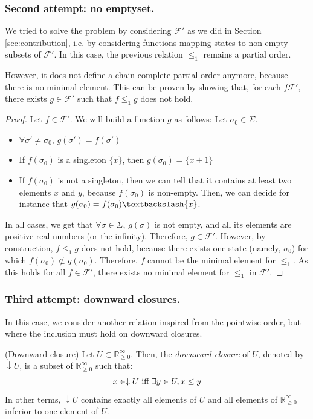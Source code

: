\documentclass[a4paper,10pt]{llncs}
\def\RRposi {{\mathbb R_{\geq 0}^{\infty}}}
\begin{document}
\subsubsection{Second attempt: no emptyset.}
We tried to solve the problem by considering $\mathcal{F}'$ as we did in Section \ref{sec:contribution}, i.e. by considering functions mapping states to \underline{non-empty} subsets of $\mathcal{F}'$. In this case, the previous relation $\leq_1$ remains a partial order. \bigskip

However, it does not define a chain-complete partial order anymore, because there is no minimal element. This can be proven by showing that, for each $f \mathcal{F}'$, there exists $g \in \mathcal{F}'$ such that $f \leq_1 g$ does not hold.\bigskip

\begin{proof}
Let $f \in \mathcal{F}'$. We will build a function $g$ as follows:
Let $\sigma_0 \in \Sigma$.
\begin{itemize}
\item $\forall \sigma' \neq \sigma_0$, $g(\sigma') = f(\sigma')$
\item If $f(\sigma_0)$ is a singleton $\{x\}$, then $g(\sigma_0) = \{x + 1\}$
\item If $f(\sigma_0)$ is not a singleton, then we can tell that it contains at least two elements $x$ and $y$, because $f(\sigma_0)$ is non-empty. Then, we can decide for instance that $g(\sigma_0) = f(\sigma_0)\textbackslash\{x\}$.
\end{itemize}
In all cases, we get that $\forall \sigma \in \Sigma$, $g(\sigma)$ is not empty, and all its elements are positive real numbers (or the infinity). Therefore, $g \in \mathcal{F}'$. However, by construction, $f \leq_1 g$ does not hold, because there exists one state (namely, $\sigma_0$) for which $f(\sigma_0) \not\subset g(\sigma_0)$.\newline
Therefore, $f$ cannot be the minimal element for $\leq_1$. As this holds for all $f \in \mathcal{F}'$, there exists no minimal element for $\leq_1$ in $\mathcal{F}'$.
\end{proof}

\subsubsection{Third attempt: downward closures.} In this case, we consider another relation inspired from the pointwise order, but where the inclusion must hold on downward closures.

\begin{definition}{\textnormal{(Downward closure)\newline}}
Let $U \subset \RRposi$. Then, the \emph{downward closure} of $U$, denoted by $\downarrow U$, is a subset of $\RRposi$ such that:
$$x \in \downarrow U \textnormal{ iff } \exists y \in U, x \leq y$$
In other terms, $\downarrow U$ contains exactly all elements of $U$ and all elements of $\RRposi$ inferior to one element of $U$.
\end{definition}
\end{document}
